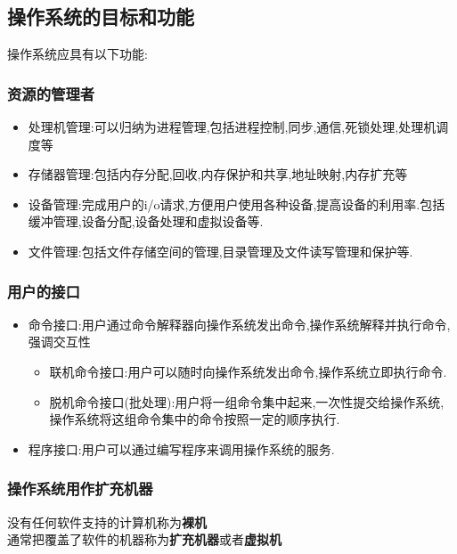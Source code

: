 \documentclass{ctexart}
\begin{document}
\subsection{操作系统的目标和功能}
操作系统应具有以下功能:
\subsubsection{资源的管理者}
\begin{itemize}
	\item 处理机管理:可以归纳为进程管理,包括进程控制,同步,通信,死锁处理,处理机调度等
	\item 存储器管理:包括内存分配,回收,内存保护和共享,地址映射,内存扩充等
	\item 设备管理:完成用户的i/o请求,方便用户使用各种设备,提高设备的利用率.包括缓冲管理,设备分配,设备处理和虚拟设备等.
	\item 文件管理:包括文件存储空间的管理,目录管理及文件读写管理和保护等.
\end{itemize}
\subsubsection{用户的接口}
\begin{itemize}
	\item 命令接口:用户通过命令解释器向操作系统发出命令,操作系统解释并执行命令,强调交互性\\
	      \begin{itemize}
		      \item 联机命令接口:用户可以随时向操作系统发出命令,操作系统立即执行命令.\\
		      \item 脱机命令接口(批处理):用户将一组命令集中起来,一次性提交给操作系统,操作系统将这组命令集中的命令按照一定的顺序执行.
	      \end{itemize}
	\item 程序接口:用户可以通过编写程序来调用操作系统的服务.
\end{itemize}
\subsubsection{操作系统用作扩充机器}
没有任何软件支持的计算机称为\textbf{裸机}\\
通常把覆盖了软件的机器称为\textbf{扩充机器}或者\textbf{虚拟机}
\end{document}
